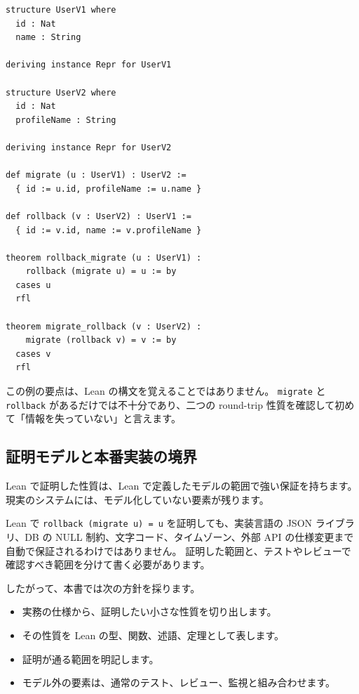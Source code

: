 \begin{listing}[htbp]
\begin{verbatim}
structure UserV1 where
  id : Nat
  name : String

deriving instance Repr for UserV1

structure UserV2 where
  id : Nat
  profileName : String

deriving instance Repr for UserV2

def migrate (u : UserV1) : UserV2 :=
  { id := u.id, profileName := u.name }

def rollback (v : UserV2) : UserV1 :=
  { id := v.id, name := v.profileName }

theorem rollback_migrate (u : UserV1) :
    rollback (migrate u) = u := by
  cases u
  rfl

theorem migrate_rollback (v : UserV2) :
    migrate (rollback v) = v := by
  cases v
  rfl
\end{verbatim}
\caption{\texttt{migrate}・\texttt{rollback}・round-trip}
\label{lst:ch00_roundtrip_preview}
\end{listing}

この例の要点は、Lean の構文を覚えることではありません。
\texttt{migrate} と \texttt{rollback} があるだけでは不十分であり、二つの round-trip 性質を確認して初めて「情報を失っていない」と言えます。

\subsection{証明モデルと本番実装の境界}

Lean で証明した性質は、Lean で定義したモデルの範囲で強い保証を持ちます。
現実のシステムには、モデル化していない要素が残ります。

Lean で \texttt{rollback (migrate u) = u} を証明しても、実装言語の JSON ライブラリ、DB の NULL 制約、文字コード、タイムゾーン、外部 API の仕様変更まで自動で保証されるわけではありません。
証明した範囲と、テストやレビューで確認すべき範囲を分けて書く必要があります。

したがって、本書では次の方針を採ります。

\begin{itemize}
\item 実務の仕様から、証明したい小さな性質を切り出します。
\item その性質を Lean の型、関数、述語、定理として表します。
\item 証明が通る範囲を明記します。
\item モデル外の要素は、通常のテスト、レビュー、監視と組み合わせます。
\end{itemize}

